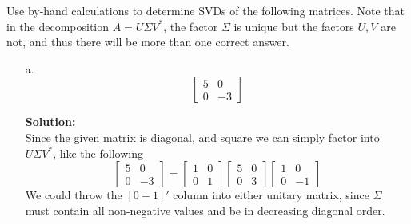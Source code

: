 \documentclass[12pt]{article}
\makeatletter
\theoremstyle{homework}
\newenvironment{exercise}[1]
{\def\@currentlabel{#1}\exercisecore}
{\endexercisecore}
\newcommand{\localhead}[1]{\par\smallskip\noindent\textbf{#1}\nobreak\\}%
\newcommand\solution{\localhead{Solution:}}
\makeatother
\begin{document}
\begin{exercise}{P10} Use by-hand calculations to determine SVDs of the following matrices. 
  Note that in the decomposition $A = U \Sigma V^*$, the factor $\Sigma$ is unique but the factors
  $U, V$ are not, and thus there will be more than one correct answer. 
  \begin{enumerate}
    \item[a.]
    \begin{equation*}
      \begin{bmatrix}
        5 & 0\\
        0 & -3
      \end{bmatrix}
    \end{equation*} 
    \solution 
    Since the given matrix is diagonal, and square we can simply factor into $U\Sigma V^*$, like the following 
    \begin{equation*}
      \begin{bmatrix}
        5 & 0\\
        0 & -3
      \end{bmatrix} = 
      \begin{bmatrix}
        1 & 0\\
        0 & 1
      \end{bmatrix}
      \begin{bmatrix}
        5 & 0\\
        0 & 3
      \end{bmatrix}
      \begin{bmatrix}
        1 & 0\\
        0 & -1
      \end{bmatrix}
    \end{equation*}
    We could throw the $[0 -1]'$ column into either unitary matrix, since $\Sigma$ must contain all non-negative 
    values and be in decreasing diagonal order.
    \vspace{.15in}





\end{enumerate}
\end{exercise}
\end{document}
